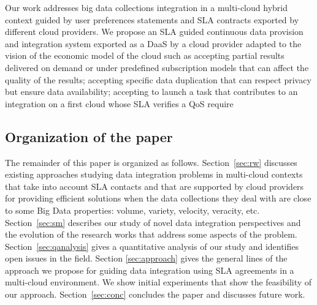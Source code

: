Our work addresses big data collections integration  in a multi-cloud hybrid context guided by user preferences statements and SLA contracts exported by different cloud providers. We propose an SLA guided continuous data provision and integration system exported as a DaaS by a cloud provider adapted to the vision of the economic model of the cloud such as accepting partial results delivered on demand or under predefined subscription models that can affect the quality of the results; accepting specific data duplication that can respect privacy but ensure data availability; accepting to launch a task that contributes to an integration on a first cloud whose SLA verifies a QoS require

\subsection{Organization of the paper}
The remainder of this paper is organized as follows. 
Section~\ref{sec:rw} discusses existing approaches studying data integration problems in multi-cloud contexts that take into account SLA contacts and that are supported by cloud providers for providing efficient solutions when the data collections they deal with are close to some Big Data properties: volume, variety, velocity, veracity, etc.
Section~\ref{sec:sm} describes our study of novel data integration perspectives and the evolution of the research works that address some aspects of the problem. Section~\ref{sec:qanalysis} gives a quantitative analysis of our study and identifies open issues in the field. Section \ref{sec:approach} gives the general lines of the approach we propose for guiding data integration using SLA agreements in a multi-cloud environment. We show initial experiments that show the feasibility of our approach.  
Section~\ref{sec:conc} concludes the paper and discusses future work. 


